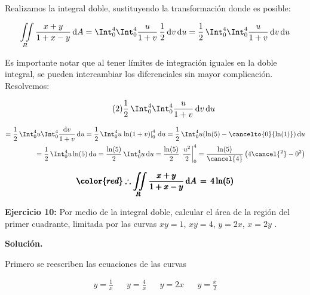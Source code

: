 \documentclass[12pt]{article}
\begin{document}
\noindent Realizamos la integral doble, sustituyendo la transformación donde es posible:

\begin{equation*}
	 \iint\limits_R \frac{x+y}{1+x-y}\, \mathrm{d}A = \Int_0^4\Int_0^4 \frac{u}{1+v}\, \frac{1}{2}\,\mathrm{d}v\,\mathrm{d}u = \frac{1}{2}\,\Int_0^4\Int_0^4 \frac{u}{1+v}\, \mathrm{d}v\,\mathrm{d}u 
\end{equation*}

\noindent Es importante notar que al tener límites de integración iguales en la doble integral, se pueden intercambiar los diferenciales sin mayor complicación. Resolvemos:

\begin{equation}\label{eqn:9-2}\tag{2}
	\frac{1}{2}\,\Int_0^4\Int_0^4 \frac{u}{1+v}\, \mathrm{d}v\,\mathrm{d}u
\end{equation}

\begin{align*}
	= \frac{1}{2}\,\Int_0^4 u \Int_0^4 \frac{\mathrm{d}v}{1+v}\, \mathrm{d}u
	= \frac{1}{2}\,\Int_0^4 u \left.\ln(1+v)\right|_0^4\, \mathrm{d}u = \frac{1}{2}\,\Int_0^4 u( \ln(5)-\cancelto{0}{\ln(1)})\, \mathrm{d}u \\
	= \frac{1}{2}\,\Int_0^4 u \ln(5)\, \mathrm{d}u = \frac{\ln(5)}{2}\,\Int_0^4 u\, \mathrm{d}u = \frac{\ln(5)}{2}\, \left.\frac{u^2}{2}\right|_0^4 = \frac{\ln(5)}{\cancel{4}}\left(4\cancel{^2}-0^2\right)
\end{align*}

\begin{align*}
	\pmb{\color{red} \therefore \iint\limits_R \frac{x+y}{1+x-y}\, \mathrm{d}A\, = \,4\ln(5)}
\end{align*}

\noindent \textbf{Ejercicio 10:} Por medio de la integral doble, calcular el área de la 
región del primer cuadrante, limitada por las curvas $xy = 1$, $xy = 4$, $y = 2x$, $x = 2y$ .

\vspace{5mm}

\noindent \textbf{Solución.}

\vspace{3mm}
Primero se reescriben las ecuaciones de las curvas

\begin{align*}
	y = \frac{1}{x} && y = \frac{4}{x} && y = 2x && y = \frac{x}{2}
\end{align*}
\end{document}
